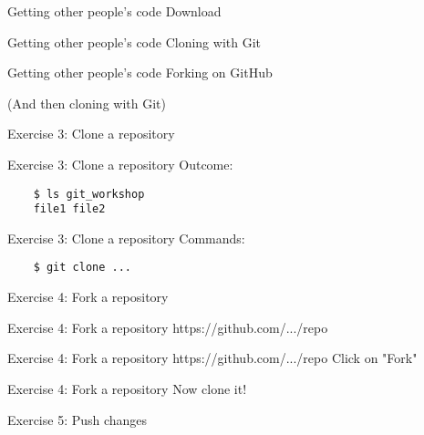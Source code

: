\documentclass{beamer}
\begin{document}
\begin{frame}{Getting other people's code}
  \center
  \Huge Download
\end{frame}

\begin{frame}{Getting other people's code}
  \center
  \Huge Cloning with Git
\end{frame}

\begin{frame}{Getting other people's code}
  \center
  \Huge Forking on GitHub

  \Large (And then cloning with Git)
\end{frame}

\begin{frame}{}
  \center
  \Huge Exercise 3: Clone a repository
\end{frame}

\begin{frame}[fragile]{Exercise 3: Clone a repository}
  Outcome:

  \begin{verbatim}
    $ ls git_workshop
    file1 file2
  \end{verbatim}
\end{frame}

\begin{frame}[fragile]{Exercise 3: Clone a repository}
  Commands:

  \begin{verbatim}
    $ git clone ...
  \end{verbatim}
\end{frame}

\begin{frame}{}
  \center
  \Huge Exercise 4: Fork a repository
\end{frame}

\begin{frame}{Exercise 4: Fork a repository}
  \center
  \Huge https://github.com/.../repo
\end{frame}

\begin{frame}{Exercise 4: Fork a repository}
  \center
  \Huge https://github.com/.../repo
  \Large Click on "Fork"
\end{frame}

\begin{frame}{Exercise 4: Fork a repository}
  \center
  \Huge Now clone it!
\end{frame}

\begin{frame}{}
  \center
  \Huge Exercise 5: Push changes
\end{frame}
\end{document}
